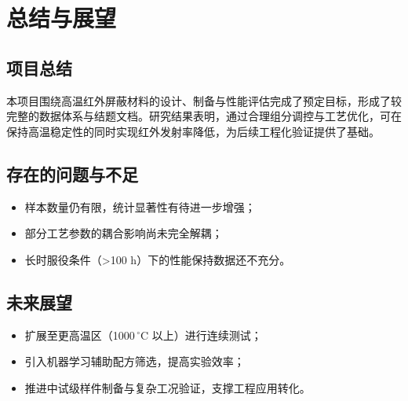 \chapter{总结与展望}

\section{项目总结}
本项目围绕高温红外屏蔽材料的设计、制备与性能评估完成了预定目标，形成了较完整的数据体系与结题文档。研究结果表明，通过合理组分调控与工艺优化，可在保持高温稳定性的同时实现红外发射率降低，为后续工程化验证提供了基础。

\section{存在的问题与不足}
\begin{itemize}
  \item 样本数量仍有限，统计显著性有待进一步增强；
  \item 部分工艺参数的耦合影响尚未完全解耦；
  \item 长时服役条件（>100 h）下的性能保持数据还不充分。
\end{itemize}

\section{未来展望}
\begin{itemize}
  \item 扩展至更高温区（1000\,$^{\circ}$C 以上）进行连续测试；
  \item 引入机器学习辅助配方筛选，提高实验效率；
  \item 推进中试级样件制备与复杂工况验证，支撑工程应用转化。
\end{itemize}
